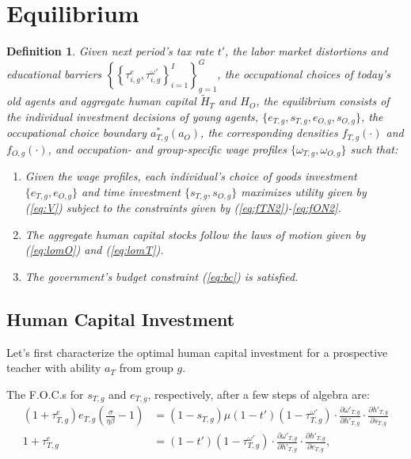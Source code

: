 \documentclass[onehalfspacing,11pt]{article}
\newtheorem{df}{Definition}
\begin{document}
\section{Equilibrium}\label{sec:equilibrium}
\begin{df}
Given next period's tax rate $t'$, the labor market distortions and educational barriers $\left\{ \left\{ \tau_{i,g}^e,\tau_{i,g}^{\omega '} \right\}_{i=1}^I \right\}_{g=1}^G$, the occupational choices of today's old agents and aggregate human capital $\widetilde{H}_{T}$ and ${H}_{O}$, the equilibrium consists of the individual investment decisions of young agents, $\{e_{T,g}, s_{T,g}, e_{O,g}, s_{O,g}\}$, the occupational choice boundary $a^*_{T,g}(a_O)$, the corresponding densities $f_{T,g}\left(\cdot\right)$ and $f_{O,g}\left(\cdot\right)$, and occupation- and group-specific wage profiles $\{\omega_{T,g}, \omega_{O,g}\}$ such that:
\begin{enumerate}
  \item Given the wage profiles, each individual's choice of goods investment $\{e_{T,g}, e_{O,g}\}$ and time investment $\{s_{T,g}, s_{O,g}\}$ maximizes utility given by (\ref{eq:V}) subject to the constraints given by (\ref{eq:fTN2})-\eqref{eq:fON2}.
  \item The aggregate human capital stocks follow the laws of motion given by (\ref{eq:lomO}) and (\ref{eq:lomT}).
  \item The government's budget constraint (\ref{eq:bc}) is satisfied.
\end{enumerate}
\end{df}

\subsection{Human Capital Investment}
Let's first characterize the optimal human capital investment for a prospective teacher with ability $a_T$ from group $g$.%

The F.O.C.s for $s_{T,g}$ and $e_{T,g}$, respectively, after a few steps of algebra are:
\begin{align}
\label{eq:foc-e}
(1+\tau^e_{T,g}) e_{T,g} \left( \tfrac{\sigma}{\eta\beta }-1 \right) & = \left(1-s_{T,g}\right) \mu(1-t')(1-\tau^{\omega '}_{T,g}) \cdot \tfrac{\partial \omega'_{T,g}}{\partial h'_{T,g}} \cdot \tfrac{\partial h'_{T,g}}{\partial s_{T,g}}\\
\label{eq:foc-s}
1+\tau^e_{T,g} & = (1-t')(1-\tau^{\omega '}_{T,g})\cdot \tfrac{\partial \omega'_{T,g}}{\partial h'_{T,g}}\cdot \tfrac{\partial h'_{T,g}}{\partial e_{T,g}},
\end{align}
\end{document}
